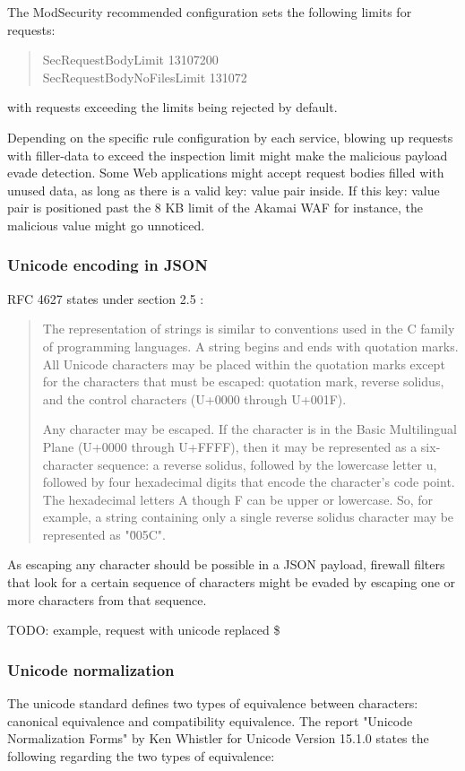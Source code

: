 The ModSecurity recommended configuration sets the following limits for requests:
\begin{quote}
	SecRequestBodyLimit 13107200 \\
	SecRequestBodyNoFilesLimit 131072
\end{quote}
with requests exceeding the limits being rejected by default. \cite{modsec/recconf}

Depending on the specific rule configuration by each service, blowing up requests with filler-data to exceed the inspection limit might make the malicious payload evade detection. Some Web applications might accept request bodies filled with unused data, as long as there is a valid key: value pair inside. If this key: value pair is positioned past the 8 KB limit of the Akamai WAF for instance, the malicious value might go unnoticed.


\subsubsection{Unicode encoding in JSON}
RFC 4627  states under section 2.5 :
\begin{quote}
	The representation of strings is similar to conventions used in the C
	family of programming languages.  A string begins and ends with
	quotation marks.  All Unicode characters may be placed within the
	quotation marks except for the characters that must be escaped:
	quotation mark, reverse solidus, and the control characters (U+0000
	through U+001F).

	Any character may be escaped.  If the character is in the Basic
	Multilingual Plane (U+0000 through U+FFFF), then it may be
	represented as a six-character sequence: a reverse solidus, followed
	by the lowercase letter u, followed by four hexadecimal digits that
	encode the character's code point.  The hexadecimal letters A though
	F can be upper or lowercase.  So, for example, a string containing
	only a single reverse solidus character may be represented as
	"\u005C". \cite{rfc4627}
\end{quote}
As escaping any character should be possible in a JSON payload, firewall filters that look for a certain sequence of characters might be evaded by escaping one or more characters from that sequence.

	{\color{red} TODO: example, request with unicode replaced \$ }


\subsubsection{Unicode normalization}
The unicode standard defines two types of equivalence between characters: canonical equivalence and compatibility equivalence. The report "Unicode Normalization Forms" by Ken Whistler for Unicode Version 15.1.0 states the following regarding the two types of equivalence:


